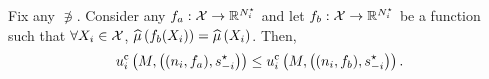 \begin{lemma}
   \label{lem:NIC-part2} 
   Fix any $\nni$. Consider any $f_a:\mathcal{X}\rightarrow\mathbb{R}^{N^\star_i}$ and let $f_b:\mathcal{X}\rightarrow\mathbb{R}^{N^\star_i}$ be a function such that 
   $\forall X_{i}\in\mathcal{X}$, $\widehat{\mu}\left(f_b(X_{i})\right)=\widehat{\mu}\left(X_{i}\right)$. Then,
    \begin{align*}
        u^{\rm c}_{i} \left(M, \left((n_i,f_a),s_{-i}^{\star} \right)\right)
        \leq
        u^{\rm c}_{i} \left(M, \left((n_i,f_b),s_{-i}^{\star} \right)\right) .
    \end{align*}
\end{lemma}
